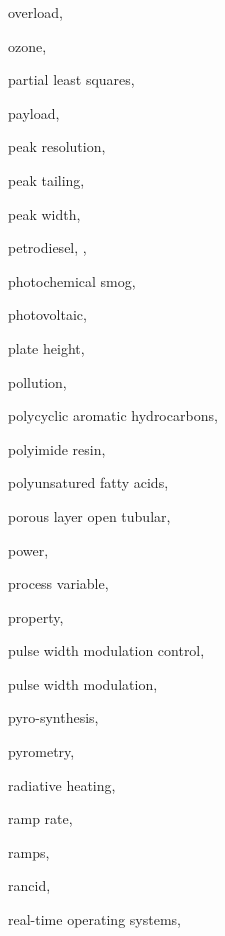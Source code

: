 \begin{theindex}
  \item \lowercase {overload}, 
  \item \lowercase {ozone}, 
  \item \lowercase {partial least squares}, 
  \item \lowercase {payload}, 
  \item \lowercase {peak resolution}, 
  \item \lowercase {peak tailing}, 
  \item \lowercase {peak width}, 
  \item \lowercase {petrodiesel}, , 
  \item \lowercase {photochemical smog}, 
  \item \lowercase {photovoltaic}, 
  \item \lowercase {plate height}, 
  \item \lowercase {pollution}, 
  \item \lowercase {polycyclic aromatic hydrocarbons}, 
  \item \lowercase {polyimide resin}, 
  \item \lowercase {polyunsatured fatty acids}, 
  \item \lowercase {porous layer open tubular}, 
  \item \lowercase {power}, 
  \item \lowercase {process variable}, 
  \item \lowercase {property}, 
  \item \lowercase {pulse width modulation control}, 
  \item \lowercase {pulse width modulation}, 
  \item \lowercase {pyro-synthesis}, 
  \item \lowercase {pyrometry}, 
  \item \lowercase {radiative heating}, 
  \item \lowercase {ramp rate}, 
  \item \lowercase {ramps}, 
  \item \lowercase {rancid}, 
  \item \lowercase {real-time operating systems}, 

\end{theindex}
